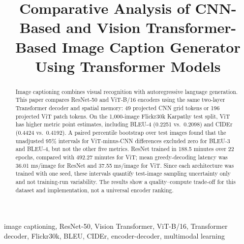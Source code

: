 \documentclass[conference]{IEEEtran}
\begin{document}
\title{Comparative Analysis of CNN-Based and Vision Transformer-Based Image Caption Generator Using Transformer Models\\
}

\author{
\and
{}
}

\maketitle

\begin{abstract}
Image captioning combines visual recognition with autoregressive language generation. This paper compares ResNet-50 and ViT-B/16 encoders using the same two-layer Transformer decoder and spatial memory: 49 projected CNN grid tokens or 196 projected ViT patch tokens. On the 1,000-image Flickr30k Karpathy test split, ViT has higher metric point estimates, including BLEU-4 (0.2251 vs.\ 0.2098) and CIDEr (0.4424 vs.\ 0.4192). A paired percentile bootstrap over test images found that the unadjusted 95\% intervals for ViT-minus-CNN differences excluded zero for BLEU-3 and BLEU-4, but not the other five metrics. ResNet trained in 188.5 minutes over 22 epochs, compared with 492.27 minutes for ViT; mean greedy-decoding latency was 36.01 ms/image for ResNet and 37.55 ms/image for ViT. Since each architecture was trained with one seed, these intervals quantify test-image sampling uncertainty only and not training-run variability. The results show a quality--compute trade-off for this dataset and implementation, not a universal encoder ranking.
\end{abstract}

\begin{IEEEkeywords}
image captioning, ResNet-50, Vision Transformer, ViT-B/16, Transformer decoder, Flickr30k, BLEU, CIDEr, encoder-decoder, multimodal learning
\end{IEEEkeywords}
\end{document}
